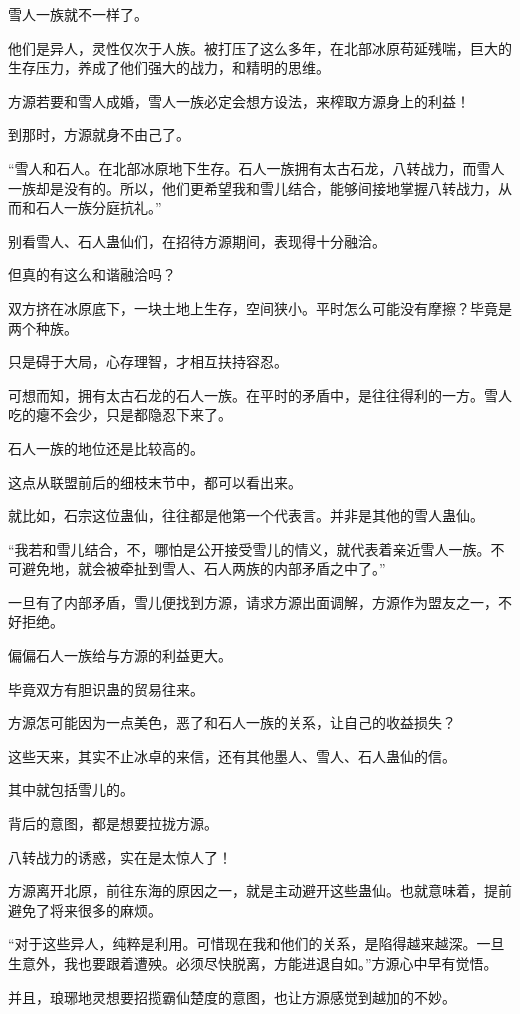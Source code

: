 \begin{this_body}
雪人一族就不一样了。

他们是异人，灵性仅次于人族。被打压了这么多年，在北部冰原苟延残喘，巨大的生存压力，养成了他们强大的战力，和精明的思维。

方源若要和雪人成婚，雪人一族必定会想方设法，来榨取方源身上的利益！

到那时，方源就身不由己了。

“雪人和石人。在北部冰原地下生存。石人一族拥有太古石龙，八转战力，而雪人一族却是没有的。所以，他们更希望我和雪儿结合，能够间接地掌握八转战力，从而和石人一族分庭抗礼。”

别看雪人、石人蛊仙们，在招待方源期间，表现得十分融洽。

但真的有这么和谐融洽吗？

双方挤在冰原底下，一块土地上生存，空间狭小。平时怎么可能没有摩擦？毕竟是两个种族。

只是碍于大局，心存理智，才相互扶持容忍。

可想而知，拥有太古石龙的石人一族。在平时的矛盾中，是往往得利的一方。雪人吃的瘪不会少，只是都隐忍下来了。

石人一族的地位还是比较高的。

这点从联盟前后的细枝末节中，都可以看出来。

就比如，石宗这位蛊仙，往往都是他第一个代表言。并非是其他的雪人蛊仙。

“我若和雪儿结合，不，哪怕是公开接受雪儿的情义，就代表着亲近雪人一族。不可避免地，就会被牵扯到雪人、石人两族的内部矛盾之中了。”

一旦有了内部矛盾，雪儿便找到方源，请求方源出面调解，方源作为盟友之一，不好拒绝。

偏偏石人一族给与方源的利益更大。

毕竟双方有胆识蛊的贸易往来。

方源怎可能因为一点美色，恶了和石人一族的关系，让自己的收益损失？

这些天来，其实不止冰卓的来信，还有其他墨人、雪人、石人蛊仙的信。

其中就包括雪儿的。

背后的意图，都是想要拉拢方源。

八转战力的诱惑，实在是太惊人了！

方源离开北原，前往东海的原因之一，就是主动避开这些蛊仙。也就意味着，提前避免了将来很多的麻烦。

“对于这些异人，纯粹是利用。可惜现在我和他们的关系，是陷得越来越深。一旦生意外，我也要跟着遭殃。必须尽快脱离，方能进退自如。”方源心中早有觉悟。

并且，琅琊地灵想要招揽霸仙楚度的意图，也让方源感觉到越加的不妙。


\end{this_body}
